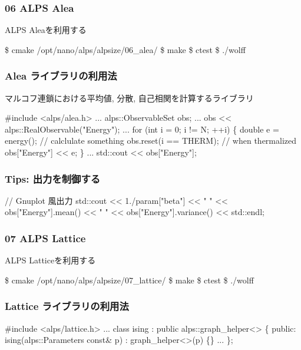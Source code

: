 \begin{frame}[fragile]
  \frametitle{06 ALPS Alea}
  ALPS Aleaを利用する
\begin{semiverbatim}
\$ cmake /opt/nano/alps/alpsize/06_alea/
\$ make
\$ ctest
\$ ./wolff
\end{semiverbatim}
\end{frame}

\begin{frame}[fragile,shrink=10] \frametitle{Alea ライブラリの利用法}
  マルコフ連鎖における平均値, 分散, 自己相関を計算するライブラリ
\begin{semiverbatim}
#include <alps/alea.h>
...
alps::ObservableSet obs;
...
obs << alps::RealObservable("Energy");
...
for (int i = 0; i != N; ++i) \{
  double e = energy(); // calclulate something
  obs.reset(i == THERM); // when thermalized
  obs["Energy"] << e;
\}
...
std::cout << obs["Energy"];
\end{semiverbatim}
\end{frame}

\begin{frame}[fragile,shrink=10] \frametitle{Tips: 出力を制御する}
\begin{semiverbatim}
// Gnuplot 風出力
std::cout << 1./param["beta"] << " "
          << obs["Energy"].mean() << " "
          << obs["Energy"].variance() << std::endl;
\end{semiverbatim}
\end{frame}

\begin{frame}[fragile]
  \frametitle{07 ALPS Lattice}
  ALPS Latticeを利用する
\begin{semiverbatim}
\$ cmake /opt/nano/alps/alpsize/07_lattice/
\$ make
\$ ctest
\$ ./wolff
\end{semiverbatim}
\end{frame}

\begin{frame}[fragile] \frametitle{Lattice ライブラリの利用法}
\begin{semiverbatim}
#include <alps/lattice.h>
...
class ising : public alps::graph_helper<> \{
 public:
  ising(alps::Parameters const& p)
   : \alert{graph_helper<>(p)} \{\}
...
\};
\end{semiverbatim}

\end{frame}

